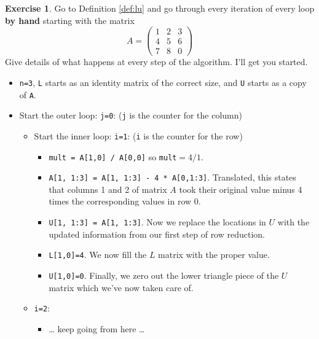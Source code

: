 \documentclass[
]{book}
\providecommand{\tightlist}{%
  \setlength{\itemsep}{0pt}\setlength{\parskip}{0pt}}
\theoremstyle{definition}
\theoremstyle{definition}
\theoremstyle{definition}
\newtheorem{exercise}{Exercise}[chapter]
\theoremstyle{remark}
\begin{document}
\begin{exercise}
\protect\hypertarget{exr:unnamed-chunk-321}{}{\label{exr:unnamed-chunk-321} }Go to Definition \ref{def:lu} and go through every iteration of every loop \textbf{by hand} starting with the matrix
\[ A = \begin{pmatrix} 1 & 2 & 3 \\ 4 & 5 & 6 \\ 7 & 8 & 0 \end{pmatrix} \]
Give details of what happens at every step of the algorithm. I'll get you started.

\begin{itemize}
\tightlist
\item
  \texttt{n=3}, \texttt{L} starts as an identity matrix of the correct size, and \texttt{U} starts as a copy of \texttt{A}.
\item
  Start the outer loop: \texttt{j=0}: (\texttt{j} is the counter for the column)

  \begin{itemize}
  \tightlist
  \item
    Start the inner loop: \texttt{i=1}: (\texttt{i} is the counter for the row)

    \begin{itemize}
    \tightlist
    \item
      \texttt{mult\ =\ A{[}1,0{]}\ /\ A{[}0,0{]}} so \texttt{mult}\(=4/1\).
    \item
      \texttt{A{[}1,\ 1:3{]}\ =\ A{[}1,\ 1:3{]}\ -\ 4\ *\ A{[}0,1:3{]}}. Translated, this states that columns 1 and 2 of matrix \(A\) took their original value minus 4 times the corresponding values in row 0.
    \item
      \texttt{U{[}1,\ 1:3{]}\ =\ A{[}1,\ 1:3{]}}. Now we replace the locations in \(U\) with the updated information from our first step of row reduction.
    \item
      \texttt{L{[}1,0{]}=4}. We now fill the \(L\) matrix with the proper value.
    \item
      \texttt{U{[}1,0{]}=0}. Finally, we zero out the lower triangle piece of the \(U\) matrix which we've now taken care of.
    \end{itemize}
  \item
    \texttt{i=2}:

    \begin{itemize}
    \tightlist
    \item
      \ldots{} keep going from here \ldots{}
    \end{itemize}
  \end{itemize}
\end{itemize}
\end{exercise}
\end{document}
